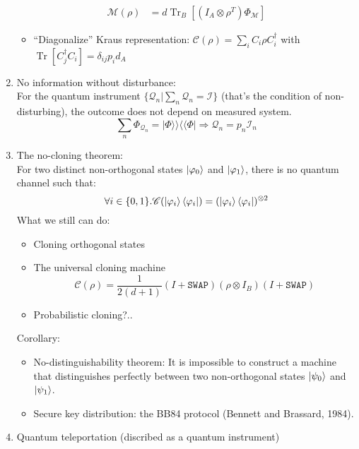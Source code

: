 \documentclass[11pt,a4paper]{article}%
\numberwithin{equation}{section}
\newcommand\kk{\rangle\!\rangle}
\newcommand\bb{\langle\!\langle}
\newcommand{\Tr}{\operatorname{Tr}}
\begin{document}
\begin{enumerate}
\begin{align}
        \mathscr M(\rho) &= d\Tr_B[(I_A\otimes \rho^T)\Phi_{\mathscr M}]
    \end{align}
    \begin{itemize}
        \item ``Diagonalize'' Kraus representation: $\mathscr C(\rho) = \sum_i C_i\rho C_i^\dagger$ with $\Tr[C_j^\dagger C_i] = \delta_{ij}p_id_A$
    \end{itemize}
    \item No information without disturbance: \\
    For the quantum instrument $\{\mathscr Q_n|\sum_n \mathscr Q_n = \mathscr I\}$ (that's the condition of non-disturbing), the outcome does not depend on measured system.
    \begin{equation}
        \sum_n\Phi_{\mathscr Q_n} = |\Phi\kk\bb\Phi| \Rightarrow \mathscr Q_n = p_n\mathscr I_n
    \end{equation}
    \item The no-cloning theorem: \\
    For two distinct non-orthogonal states $\ket{\varphi_0}$ and $\ket{\varphi_1}$, there is no quantum channel such that:
    \begin{equation}
        \forall i\in\{0,1\}. \mathscr C (\ket{\varphi_i}\bra{\varphi_i}) = (\ket{\varphi_i}\bra{\varphi_i})^{\otimes 2}
    \end{equation}
    What we still can do:
    \begin{itemize}
        \item Cloning orthogonal states
        \item The universal cloning machine
        \begin{equation}
            \mathscr C(\rho) = \frac 1{2(d+1)}(I + \mathtt{SWAP})(\rho\otimes I_B)(I + \mathtt{SWAP})
        \end{equation}
        \item Probabilistic cloning?..
    \end{itemize}
    Corollary:
    \begin{itemize}
        \item No-distinguishability theorem: It is impossible to construct a machine that distinguishes perfectly between two non-orthogonal states $\ket{\psi_0}$ and $\ket{\psi_1}$.
        \item Secure key distribution: the BB84 protocol (Bennett and Brassard, 1984).
    \end{itemize}
    \item Quantum teleportation (discribed as a quantum instrument)

\end{enumerate}
\end{document}
